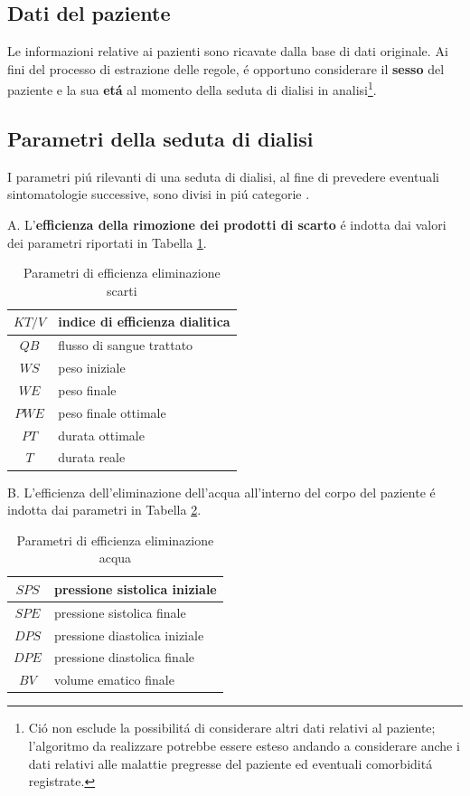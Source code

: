 \documentclass[preprint]{acm_proc_article-sp}
\begin{document}
\subsection{Dati del paziente}
Le informazioni relative ai pazienti sono ricavate dalla base di dati originale. Ai fini del processo di estrazione delle regole, \'e opportuno considerare il \textbf{sesso} del paziente e la sua \textbf{et\'a} al momento della seduta di dialisi in analisi\footnote{Ci\'o non esclude la possibilit\'a di considerare altri dati relativi al paziente; l'algoritmo da realizzare potrebbe essere esteso andando a considerare anche i dati relativi alle malattie pregresse del paziente ed eventuali comorbidit\'a registrate.}.

\subsection{Parametri della seduta di dialisi}
I parametri pi\'u rilevanti di una seduta di dialisi, al fine di prevedere eventuali sintomatologie successive, sono divisi in pi\'u categorie \cite{bellazziintelligent}  \cite{pmid15749092}.

A. L'\textbf{efficienza della rimozione dei prodotti di scarto} \'e indotta dai valori dei parametri riportati in Tabella \ref{table:parametri-1}.

\begin{table}[h]
\centering
\begin{tabular}{|c|l|} \hline
$KT/V$ & indice di efficienza dialitica\\ \hline
$QB$ & flusso di sangue trattato\\ \hline
$WS$ & peso iniziale \\ \hline
$WE$ & peso finale \\ \hline
$PWE$ & peso finale ottimale \\ \hline
$PT$ & durata ottimale \\ \hline
$T$ & durata reale \\
\hline\end{tabular}
\caption{Parametri di efficienza eliminazione scarti}
\label{table:parametri-1}
\end{table}

B. L'efficienza dell'eliminazione dell'acqua all'interno del corpo del paziente \'e indotta dai parametri in Tabella \ref{table:parametri-2}.

\begin{table}[h]
\centering
\begin{tabular}{|c|l|} \hline
$SPS$ & pressione sistolica iniziale \\ \hline
$SPE$ & pressione sistolica finale \\ \hline
$DPS$ & pressione diastolica iniziale\\ \hline
$DPE$ & pressione diastolica finale\\ \hline
$BV$ & volume ematico finale\\
\hline\end{tabular}
\caption{Parametri di efficienza eliminazione acqua}
\label{table:parametri-2}
\end{table}
\end{document}
